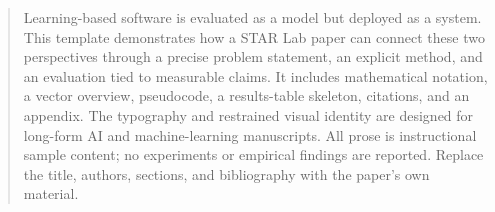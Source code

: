 \begin{abstract}
Learning-based software is evaluated as a model but deployed as a system.
This template demonstrates how a STAR Lab paper can connect these two
perspectives through a precise problem statement, an explicit method, and
an evaluation tied to measurable claims. It includes mathematical notation,
a vector overview, pseudocode, a results-table skeleton, citations, and an
appendix. The typography and restrained visual identity are designed for
long-form AI and machine-learning manuscripts. All prose is instructional
sample content; no experiments or empirical findings are reported. Replace
the title, authors, sections, and bibliography with the paper's own material.
\end{abstract}
